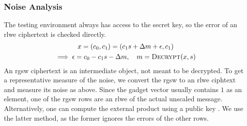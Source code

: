 

\subsubsection{Noise Analysis}
The testing environment always has access to the secret key, so the error of an \gls{rlwe} ciphertext is checked directly.
\begin{gather}
    x = (c_0, c_1) = (c_1s + \Delta m + \epsilon, c_1) \\
    \implies \epsilon = c_0 - c_1s - \Delta m, \quad m = \Call{Decrypt}{x, s}
\end{gather}
An \gls{rgsw} ciphertext is an intermediate object, not meant to be decrypted. To get a representative measure of the noise, we convert the \gls{rgsw} to an \gls{rlwe} ciphtext and measure its noise as above. Since the gadget vector usually contains $1$ as an element, one of the \gls{rgsw} rows are an \gls{rlwe} of the actual unscaled message. Alternatively, one can compute the external product using a public key . We use the latter method, as the former ignores the errors of the other rows.

